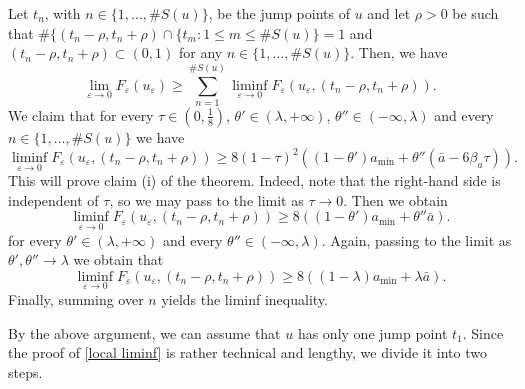 \documentclass[12pt]{article}
\numberwithin{equation}{section}
\begin{document}
 Let $t_n$, with $n\in\{1,\ldots,\#S(u)\}$, be the jump points of $u$ and let $\rho>0$ be such that $\#\{(t_n-\rho,t_n+\rho)\cap\{t_m: 1\le m\le \#S(u)\}=1$ and $(t_n-\rho,t_n+\rho)
 \subset(0,1)$ for any $n\in\{1,...,\#S(u)\}$. Then, we have 
 \begin{equation*}
     \lim_{\varepsilon\to0}F_{\varepsilon}(u_{\varepsilon})\ge\sum_{n=1}^{\#S(u)}\liminf_{\varepsilon\to0}F_{\varepsilon}(u_{\varepsilon},(t_n-\rho,t_n+\rho)).
 \end{equation*}
 We claim that for every $\tau\in(0,\frac{1}{8})$, $\theta'\in(\lambda,+\infty)$, $\theta''\in(-\infty,\lambda)$ and every $n\in\{1,...,\#S(u)\}$ we have
 \begin{equation}\label{local liminf}
     \liminf_{\varepsilon\to0}F_{\varepsilon}(u_{\varepsilon},(t_n-\rho,t_n+\rho))\ge8(1-\tau)^{2}((1-\theta')a_{\min}+\theta''(\bar{a}-6\beta_{a}\tau)).
 \end{equation}
This will prove claim (i) of the theorem. Indeed, note that the right-hand side is independent of $\tau$, so we may pass to the limit as $\tau\to0$. Then we obtain 
 \[
  \liminf_{\varepsilon\to0}F_{\varepsilon}(u_{\varepsilon},(t_n-\rho,t_n+\rho))\ge8((1-\theta')a_{\min}+\theta''\bar{a}).
 \]
 for every $\theta'\in(\lambda,+\infty)$ and every $\theta''\in(-\infty,\lambda)$. Again, passing to the limit as $\theta',\theta''\to\lambda$ we obtain that 
 \[
  \liminf_{\varepsilon\to0}F_{\varepsilon}(u_{\varepsilon},(t_n-\rho,t_n+\rho))\ge8((1-\lambda)a_{\min}+\lambda\bar{a}).
 \]
 Finally, summing over $n$ yields the liminf inequality.

 By the above argument, we can assume that $u$ has only one jump point $t_1$. Since the proof of \eqref{local liminf} is rather technical and lengthy, we divide it into two steps.

\def\thet{\theta(\epsilon)}
\end{document}
